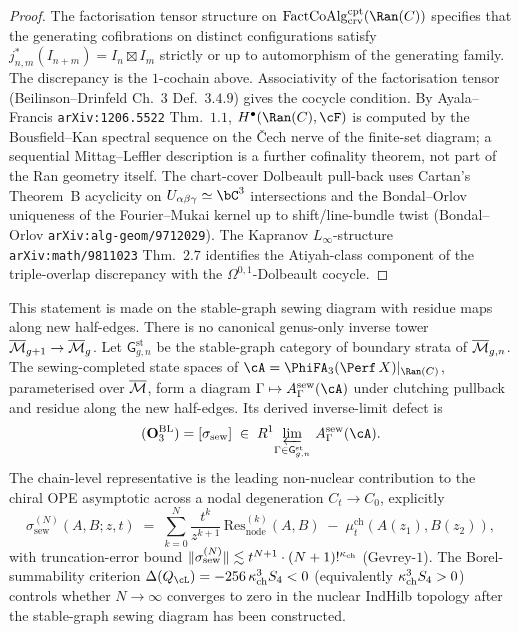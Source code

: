 \begin{proof}
The factorisation tensor structure on
$\FactCoAlg^{\cpt}_{\crv}(\Ran(C))$ specifies that the generating
cofibrations on distinct configurations satisfy
$j^*_{n, m}(I_{n+m}) = I_n \boxtimes I_m$ strictly or up to
automorphism of the generating family. The discrepancy is the
$1$-cochain above. Associativity of the factorisation tensor
(Beilinson--Drinfeld Ch.~$3$ Def.~$3.4.9$) gives the cocycle
condition. By Ayala--Francis \texttt{arXiv:1206.5522} Thm.~$1.1$,
$H^\bullet(\Ran(C), \cF)$ is computed by the
Bousfield--Kan spectral sequence on the \v{C}ech nerve of the finite-set
diagram; a sequential Mittag--Leffler description is a further
cofinality theorem, not part of the Ran geometry itself. The chart-cover Dolbeault pull-back
uses Cartan's Theorem~B acyclicity on $U_{\alpha\beta\gamma}
\simeq \bC^3$ intersections and the Bondal--Orlov uniqueness of the
Fourier--Mukai kernel up to shift/line-bundle twist
(Bondal--Orlov \texttt{arXiv:alg-geom/9712029}). The Kapranov
$L_\infty$-structure \texttt{arXiv:math/9811023} Thm.~$2.7$
identifies the Atiyah-class component of the triple-overlap
discrepancy with the $\Omega^{0, 1}$-Dolbeault cocycle.
\end{proof}

\begin{proposition}
\label{prop:O3-BL-ml-defect}
This statement is made on the stable-graph sewing diagram with residue
maps along new half-edges. There is no canonical genus-only inverse
tower $\overline{\mathcal{M}}_{g+1}\to\overline{\mathcal{M}}_g$.
Let $\mathsf G^{\mathrm{st}}_{g,n}$ be the stable-graph category of
boundary strata of $\overline{\mathcal{M}}_{g,n}$.  The sewing-completed state spaces of
$\cA = \PhiFA_3(\Perf\,X)|_{\Ran(C)}$, parameterised over $\overline{\mathcal{M}}$, form
a diagram
$\Gamma\mapsto A^{\mathrm{sew}}_\Gamma(\cA)$ under clutching pullback
and residue along the new half-edges.  Its derived inverse-limit defect is
\[
(\mathbf{O}_3^{\mathrm{BL}}) = [\sigma_{\mathrm{sew}}]
\;\in\; R^1\!\varprojlim_{\Gamma\in\mathsf G^{\mathrm{st}}_{g,n}}\,
A^{\mathrm{sew}}_\Gamma(\cA).
\]
The chain-level representative is the leading non-nuclear
contribution to the chiral OPE asymptotic across a nodal
degeneration $C_t \to C_0$, explicitly
\[
\sigma_{\mathrm{sew}}^{(N)}(A, B; z, t)
\;=\;
\sum_{k=0}^{N} \frac{t^k}{z^{k+1}}\,
\mathrm{Res}_{\mathrm{node}}^{(k)}(A, B) \;-\;
\mu^{\mathrm{ch}}_t(A(z_1), B(z_2)),
\]
with truncation-error bound
$\|\sigma_{\mathrm{sew}}^{(N)}\| \lesssim t^{N+1} \cdot
(N+1)!^{\kappa_{\mathrm{ch}}}$ (Gevrey-$1$). The Borel-summability criterion
$\Delta(Q_\cL) = -256\,\kch^3 S_4 < 0$
(equivalently $\kappa_{\mathrm{ch}}^3 S_4 > 0$) controls whether $N \to \infty$
converges to zero in the nuclear IndHilb topology after the stable-graph
sewing diagram has been constructed.
\end{proposition}

